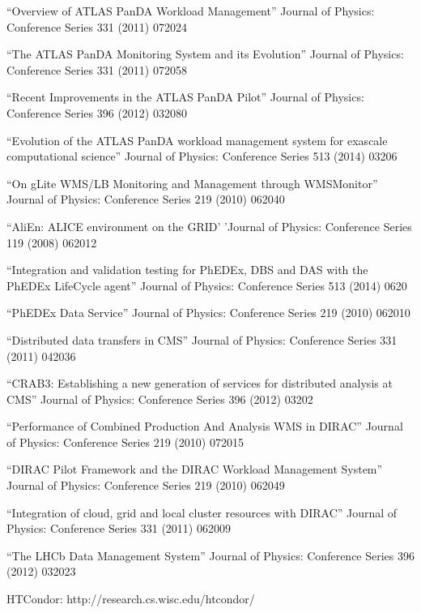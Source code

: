 \begin{thebibliography}{99}
 ``Overview of ATLAS PanDA Workload Management'' Journal of Physics: Conference Series 331 (2011) 072024

 ``The ATLAS PanDA Monitoring System and its Evolution'' Journal of Physics: Conference Series 331 (2011) 072058

 ``Recent Improvements in the ATLAS PanDA Pilot'' Journal of Physics: Conference Series 396 (2012) 032080

 ``Evolution of the ATLAS PanDA workload management system for exascale computational science'' Journal of Physics: Conference Series 513 (2014) 03206

 ``On gLite WMS/LB Monitoring and Management through WMSMonitor'' Journal of Physics: Conference Series 219 (2010) 062040

 ``AliEn: ALICE environment on the GRID' 'Journal of Physics: Conference Series 119 (2008) 062012

 ``Integration and validation testing for PhEDEx, DBS and DAS with the PhEDEx LifeCycle agent'' Journal of Physics: Conference Series 513 (2014) 0620

 ``PhEDEx Data Service'' Journal of Physics: Conference Series 219 (2010) 062010

 ``Distributed data transfers in CMS'' Journal of Physics: Conference Series 331 (2011) 042036

 ``CRAB3: Establishing a new generation of services for distributed analysis at CMS'' Journal of Physics: Conference Series 396 (2012) 03202

 ``Performance of Combined Production And Analysis WMS in DIRAC'' Journal of Physics: Conference Series 219 (2010) 072015

 ``DIRAC Pilot Framework and the DIRAC Workload Management System'' Journal of Physics: Conference Series 219 (2010) 062049

 ``Integration of cloud, grid and local cluster resources with DIRAC'' Journal of Physics: Conference Series 331 (2011) 062009

 ``The LHCb Data Management System'' Journal of Physics: Conference Series 396 (2012) 032023

 HTCondor: http://research.cs.wisc.edu/htcondor/


\end{thebibliography}
